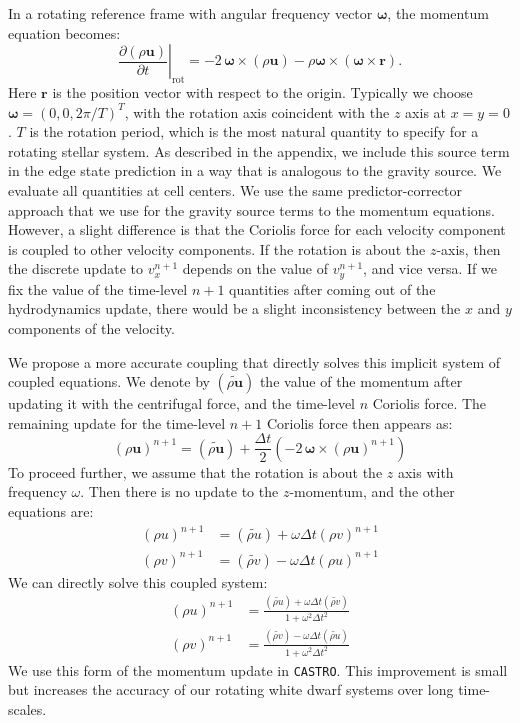 \documentclass[iop]{../emulateapj}
\newcommand{\castro}{\texttt{CASTRO}}
\begin{document}
In a rotating reference frame with angular frequency vector $\bm{\omega}$, the momentum equation becomes:
\begin{equation}
  \left.\frac{\partial(\rho \mathbf{u})}{\partial t}\right|_{\text{rot}} = -2\, {\bm\omega} \times (\rho\mathbf{u}) - \rho {\bm\omega} \times \left({\bm\omega} \times \mathbf{r}\right).
\end{equation}
Here $\mathbf{r}$ is the position vector with respect to the origin. Typically we choose $\bm{\omega} = (0, 0, 2\pi / T)^T$,
with the rotation axis coincident with the $z$ axis at $x = y = 0$.
$T$ is the rotation period, which is the most natural quantity to specify
for a rotating stellar system. As described in the appendix, we include this source term
in the edge state prediction in a way that is analogous to the gravity source.
We evaluate all quantities at cell centers. We use the same predictor-corrector 
approach that we use for the gravity source terms to the momentum equations. However, a slight 
difference is that the Coriolis force for each velocity component is coupled to other velocity 
components. If the rotation is about the $z$-axis, then the discrete update to 
$v_x^{n+1}$ depends on the value of $v_y^{n+1}$, and vice versa. If we fix the value of 
the time-level $n+1$ quantities after coming out of the hydrodynamics update, there 
would be a slight inconsistency between the $x$ and $y$ components of the velocity. 

We propose a more accurate coupling that directly solves this implicit system of coupled 
equations. We denote by $(\widetilde{\rho \mathbf{u}})$ the value of the momentum after 
updating it with the centrifugal force, and the time-level $n$ Coriolis force. The remaining 
update for the time-level $n+1$ Coriolis force then appears as:
\begin{equation}
  (\rho \mathbf{u})^{n+1} = (\widetilde{\rho\mathbf{u}}) + \frac{\Delta t}{2} \left(-2\, {\bm\omega} \times (\rho\mathbf{u})^{n+1}\right)
\end{equation}
To proceed further, we assume that the rotation is about the $z$ axis with frequency $\omega$. 
Then there is no update to the $z$-momentum, and the other equations are:
\begin{align}
  (\rho u)^{n+1} &= (\widetilde{\rho u}) + \omega \Delta t (\rho v)^{n+1} \\
  (\rho v)^{n+1} &= (\widetilde{\rho v}) - \omega \Delta t (\rho u)^{n+1}
\end{align} 
We can directly solve this coupled system:
\begin{align}
  (\rho u)^{n+1} &= \frac{ (\widetilde{\rho u}) + \omega \Delta t (\widetilde{\rho v})}{1 + \omega^2 \Delta t^2} \\
  (\rho v)^{n+1} &= \frac{ (\widetilde{\rho v}) - \omega \Delta t (\widetilde{\rho u})}{1 + \omega^2 \Delta t^2}
\end{align}
We use this form of the momentum update in \castro. This improvement is small
but increases the accuracy of our rotating white dwarf systems over long time-scales.
\end{document}
